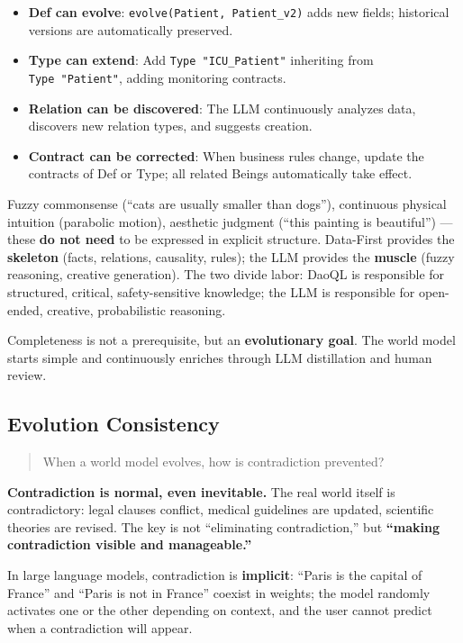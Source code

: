 \documentclass[11pt,a4paper]{article}
\begin{document}
\begin{itemize}
\tightlist
\item
  \textbf{Def can evolve}: \texttt{evolve(Patient,\ Patient\_v2)} adds
  new fields; historical versions are automatically preserved.
\item
  \textbf{Type can extend}: Add \texttt{Type\ "ICU\_Patient"} inheriting
  from \texttt{Type\ "Patient"}, adding monitoring contracts.
\item
  \textbf{Relation can be discovered}: The LLM continuously analyzes
  data, discovers new relation types, and suggests creation.
\item
  \textbf{Contract can be corrected}: When business rules change, update
  the contracts of Def or Type; all related Beings automatically take
  effect.
\end{itemize}

Fuzzy commonsense (``cats are usually smaller than dogs''), continuous
physical intuition (parabolic motion), aesthetic judgment (``this
painting is beautiful'') --- these \textbf{do not need} to be expressed
in explicit structure. Data-First provides the \textbf{skeleton} (facts,
relations, causality, rules); the LLM provides the \textbf{muscle}
(fuzzy reasoning, creative generation). The two divide labor: DaoQL is
responsible for structured, critical, safety-sensitive knowledge; the
LLM is responsible for open-ended, creative, probabilistic reasoning.

Completeness is not a prerequisite, but an \textbf{evolutionary goal}.
The world model starts simple and continuously enriches through LLM
distillation and human review.

\subsection{Evolution Consistency}\label{evolution-consistency}

\begin{quote}
When a world model evolves, how is contradiction prevented?
\end{quote}

\textbf{Contradiction is normal, even inevitable.} The real world itself
is contradictory: legal clauses conflict, medical guidelines are
updated, scientific theories are revised. The key is not ``eliminating
contradiction,'' but \textbf{``making contradiction visible and
manageable.''}

In large language models, contradiction is \textbf{implicit}: ``Paris is
the capital of France'' and ``Paris is not in France'' coexist in
weights; the model randomly activates one or the other depending on
context, and the user cannot predict when a contradiction will appear.
\end{document}
